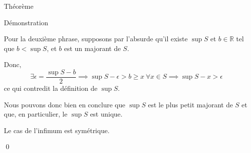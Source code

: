 \documentclass{article}
\begin{document}
\begin{parag}{Théorème}
\begin{subparag}{Démonstration}

        Pour la deuxième phrase, supposons par l'absurde qu'il existe $\sup S$ et $b \in \mathbb{R}$ tel que $b < \sup S$, et $b$ est un majorant de $S$.

        Donc,
        \[\exists \epsilon = \frac{\sup S - b}{2} \implies \sup S - \epsilon > b \geq x \ \forall x \in S \implies \sup S - x > \epsilon\]
        ce qui contredit la définition de $\sup S$.

        Nous pouvons donc bien en conclure que $\sup S$ est le plus petit majorant de $S$ et que, en particulier, le $\sup S$ est unique.

        Le cas de l'infimum est symétrique.

        \qed
    \end{subparag}
\end{parag}
\end{document}
